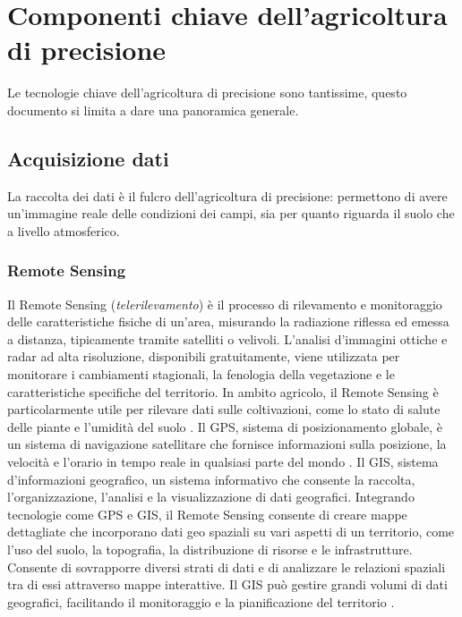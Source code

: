 \documentclass[12pt,a4paper,openright,twoside]{book}
\begin{document}
\section{Componenti chiave dell’agricoltura di precisione}
\label{componenti-chiave}

Le tecnologie chiave dell'agricoltura di precisione sono tantissime, questo documento si limita a dare una panoramica generale.

\subsection{Acquisizione dati}

La raccolta dei dati è il fulcro dell'agricoltura di precisione: permettono di avere un'immagine reale delle condizioni dei campi, sia per quanto riguarda il suolo che a livello atmosferico.

\subsubsection{Remote Sensing}

Il Remote Sensing (\textit{telerilevamento}) è il processo di rilevamento e monitoraggio delle caratteristiche fisiche di un'area, misurando la radiazione riflessa ed emessa a distanza, tipicamente tramite satelliti o velivoli\cite{USGS-REMOTE-SENSING}.
L'analisi d'immagini ottiche e radar ad alta risoluzione, disponibili gratuitamente, viene utilizzata per monitorare i cambiamenti stagionali, la fenologia della vegetazione e le caratteristiche specifiche del territorio.
In ambito agricolo, il Remote Sensing è particolarmente utile per rilevare dati sulle coltivazioni, come lo stato di salute delle piante e l'umidità del suolo \cite{FAO-REMOTE-SENSING}. \newline
Il \ac{GPS}, sistema di posizionamento globale, è un sistema di navigazione satellitare che fornisce informazioni sulla posizione, la velocità e l'orario in tempo reale in qualsiasi parte del mondo \cite{GPS-GOV}.\newline
Il \ac{GIS}, sistema d'informazioni geografico, un sistema informativo che consente la raccolta, l'organizzazione, l'analisi e la visualizzazione di dati geografici. \newline
Integrando tecnologie come \ac{GPS} e \ac{GIS}, il Remote Sensing consente di creare mappe dettagliate che incorporano dati geo spaziali su vari aspetti di un territorio, come l'uso del suolo, la topografia, la distribuzione di risorse e le infrastrutture. Consente di sovrapporre diversi strati di dati e di analizzare le relazioni spaziali tra di essi attraverso mappe interattive. Il GIS può gestire grandi volumi di dati geografici, facilitando il monitoraggio e la pianificazione del territorio \cite{GIS-ESRI}.
\end{document}

